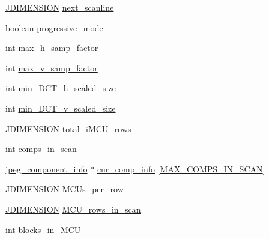 \begin{DoxyCompactItemize}
\mbox{\hyperlink{jmorecfg_8h_a04ed4674f6f1d0d50ec241531e38274f}{J\+D\+I\+M\+E\+N\+S\+I\+ON}} \mbox{\hyperlink{structjpeg__compress__struct_aefb3f2e6479374ba03e7d0421dcfb086}{next\+\_\+scanline}}
\item 
\mbox{\hyperlink{jmorecfg_8h_a7c6368b321bd9acd0149b030bb8275ed}{boolean}} \mbox{\hyperlink{structjpeg__compress__struct_ae3b16d173e7feef7b6b0e823fd2fde3f}{progressive\+\_\+mode}}
\item 
int \mbox{\hyperlink{structjpeg__compress__struct_ae8de4e6079b80e3a81135d07934c640d}{max\+\_\+h\+\_\+samp\+\_\+factor}}
\item 
int \mbox{\hyperlink{structjpeg__compress__struct_a9e03a4eb7af87c682937caed3d341d4a}{max\+\_\+v\+\_\+samp\+\_\+factor}}
\item 
int \mbox{\hyperlink{structjpeg__compress__struct_a99a75ca2f7569dcb4444e7cb35ce916f}{min\+\_\+\+D\+C\+T\+\_\+h\+\_\+scaled\+\_\+size}}
\item 
int \mbox{\hyperlink{structjpeg__compress__struct_a5d63d182b17f0885fcabf88c6a08a9a5}{min\+\_\+\+D\+C\+T\+\_\+v\+\_\+scaled\+\_\+size}}
\item 
\mbox{\hyperlink{jmorecfg_8h_a04ed4674f6f1d0d50ec241531e38274f}{J\+D\+I\+M\+E\+N\+S\+I\+ON}} \mbox{\hyperlink{structjpeg__compress__struct_aef01162f4c66434929f933a40e695f9e}{total\+\_\+i\+M\+C\+U\+\_\+rows}}
\item 
int \mbox{\hyperlink{structjpeg__compress__struct_a3387358088abbec1c8838499966c8f06}{comps\+\_\+in\+\_\+scan}}
\item 
\mbox{\hyperlink{structjpeg__component__info}{jpeg\+\_\+component\+\_\+info}} $\ast$ \mbox{\hyperlink{structjpeg__compress__struct_a1cacb367b7d69227d3086ff105bca9ab}{cur\+\_\+comp\+\_\+info}} \mbox{[}\mbox{\hyperlink{jpeglib_8h_adc7013da016c19051dc623fb3d8b35b4}{M\+A\+X\+\_\+\+C\+O\+M\+P\+S\+\_\+\+I\+N\+\_\+\+S\+C\+AN}}\mbox{]}
\item 
\mbox{\hyperlink{jmorecfg_8h_a04ed4674f6f1d0d50ec241531e38274f}{J\+D\+I\+M\+E\+N\+S\+I\+ON}} \mbox{\hyperlink{structjpeg__compress__struct_a97f0c5e0ae932d1810007077443da684}{M\+C\+Us\+\_\+per\+\_\+row}}
\item 
\mbox{\hyperlink{jmorecfg_8h_a04ed4674f6f1d0d50ec241531e38274f}{J\+D\+I\+M\+E\+N\+S\+I\+ON}} \mbox{\hyperlink{structjpeg__compress__struct_ab605396740a26114095bf99c7c7349fb}{M\+C\+U\+\_\+rows\+\_\+in\+\_\+scan}}
\item 
int \mbox{\hyperlink{structjpeg__compress__struct_ac32cf016a916984f68f158e5310a16bb}{blocks\+\_\+in\+\_\+\+M\+CU}}
\item 

\end{DoxyCompactItemize}
